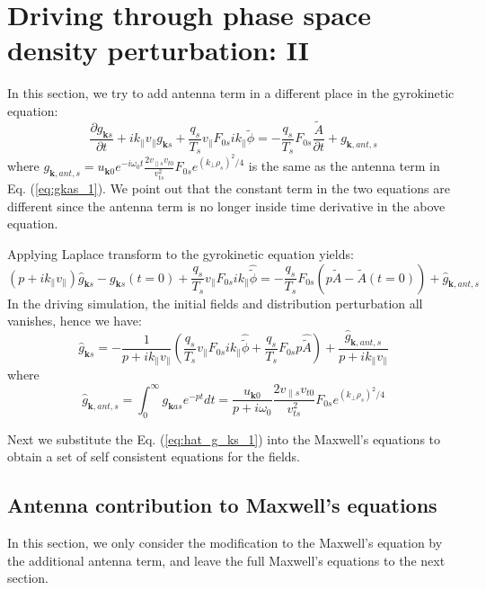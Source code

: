 \documentclass[12pt]{article}
\begin{document}
\section{Driving through phase space density perturbation: II}
In this section, we try to add antenna term in a different place in the gyrokinetic equation:
%
\begin{equation}
\frac{\partial g_{\mathbf{k}s}}{\partial t} + i k_\parallel v_\parallel g_{\mathbf{k}s} + \frac{q_s}{T_s} v_\parallel F_{0s} i k_\parallel\tilde{\phi} = -\frac{q_s}{T_s} F_{0s} \frac{\tilde{A}}{\partial{t}} + g_{\mathbf{k}, ant, s}
\end{equation}
where $g_{\mathbf{k}, ant, s} = u_{\mathbf{k}0} e^{-i\omega_0 t}  \frac{2 v_{\parallel s} v_{t0}}{v_{ts}^2} F_{0s} e^{(k_\perp \rho_s)^2/4}$ is the same as the antenna term in Eq. (\ref{eq:gkas_1}). We point out that the constant term in the two equations are different since the antenna term is no longer inside time derivative in the above equation. 

Applying Laplace transform to the gyrokinetic equation yields:
%
\begin{equation}
(p + i k_\parallel v_\parallel) \hat{g}_{\mathbf{k}s} - g_{\mathbf{k}s}(t=0) + \frac{q_s}{T_s} v_\parallel F_{0s} i k_\parallel \hat{\tilde{\phi}} = -\frac{q_s}{T_s}F_{0s} \left(p \hat{\tilde{A}} - \tilde{A} (t=0)\right)  + \hat{g}_{\mathbf{k}, ant, s}
\end{equation}
In the driving simulation, the initial fields and distribution perturbation all vanishes, hence we have:
%
\begin{equation}
\hat{g}_{\mathbf{k}s}  = -\frac{1}{p + ik_\parallel v_\parallel} \left(\frac{q_s}{T_s} v_\parallel F_{0s} i k_\parallel \hat{\tilde{\phi}} + \frac{q_s}{T_s}F_{0s} p \hat{\tilde{A}}\right) + \frac{ \hat{g}_{\mathbf{k}, ant, s}}{p + ik_\parallel v_\parallel}
\label{eq:hat_g_ks_1}
\end{equation}
where 
\begin{equation}
\hat{g}_{\mathbf{k}, ant, s} = \int_0^\infty g_{\mathbf{k}as} e^{-pt} dt = \frac{u_{\mathbf{k}0}}{p+i\omega_0} \frac{2 v_{\parallel s} v_{t0}}{v_{ts}^2} F_{0s} e^{(k_\perp \rho_s)^2/4}
\label{eq:gkas_2}
\end{equation}

Next we substitute the Eq. (\ref{eq:hat_g_ks_1}) into the Maxwell's equations to obtain a set of self consistent equations for the fields.
\subsection{Antenna contribution to Maxwell's equations}
In this section, we only consider the modification to the Maxwell's equation by the additional antenna term, and leave the full Maxwell's equations to the next section. 
\end{document}
